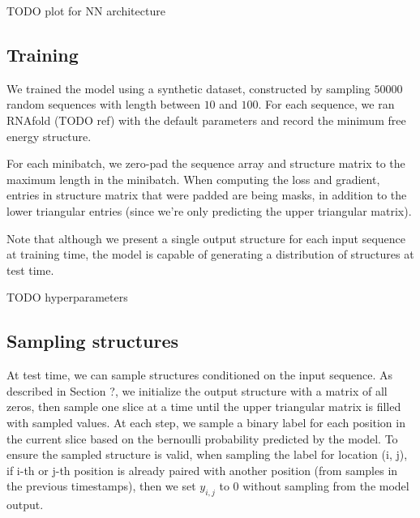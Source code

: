 \documentclass{article}
\begin{document}
%


TODO plot for NN architecture


\subsection{Training}

We trained the model using a synthetic dataset, constructed by sampling $50000$ random sequences with length
between $10$ and $100$.
For each sequence, we ran RNAfold (TODO ref) with the default parameters and
record the minimum free energy structure.

For each minibatch, we zero-pad the sequence array and structure matrix to the maximum length in the minibatch.
When computing the loss and gradient, entries in structure matrix that were padded are being masks,
in addition to the lower triangular entries (since we're only predicting the upper triangular matrix).

Note that although we present a single output structure for each input sequence at training time,
the model is capable of generating a distribution of structures at test time.

TODO hyperparameters




\subsection{Sampling structures}

At test time, we can sample structures conditioned on the input sequence.
As described in Section ?, we initialize the output structure with a matrix of all zeros,
then sample one slice at a time until the upper triangular matrix is filled with sampled values.
At each step, we sample a binary label for each position in the current slice based on the
bernoulli probability predicted by the model.
To ensure the sampled structure is valid, when sampling the label for location (i, j),
if i-th or j-th position is already paired with another position (from samples in the previous timestamps),
then we set $y_{i, j}$ to $0$ without sampling from the model output.
\end{document}
